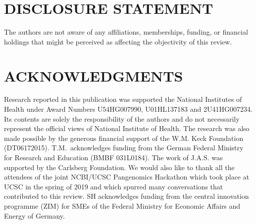 
\section*{DISCLOSURE STATEMENT}
The authors are not aware of any affiliations, memberships, funding, or financial holdings that
might be perceived as affecting the objectivity of this review. 

\section*{ACKNOWLEDGMENTS}
Research reported in this publication was supported the National Institutes of Health under Award Numbers U54HG007990, U01HL137183 and 2U41HG007234. Its contents are solely the responsibility of the authors and do not necessarily represent the official views of National Institute of Health. The research was also made possible by the generous financial support of the W.M. Keck Foundation (DT06172015). T.M.\ acknowledges funding from the German Federal Ministry for Research and Education (BMBF 031L0184). The work of J.A.S. was supported by the Carlsberg Foundation. We would also like to thank all the attendees of the joint NCBI/UCSC Pangenomics Hackathon which took place at UCSC in the spring of 2019 and which spurred many conversations that contributed to this review. SH acknowledges funding from the central innovation programme (ZIM) for SMEs of the Federal Ministry for Economic Affairs and Energy of Germany.
